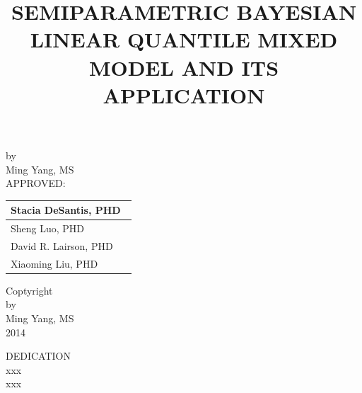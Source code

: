 \documentclass[12pt]{article}
\begin{document}
%
\begin{titlepage}
\title{\normalsize SEMIPARAMETRIC BAYESIAN LINEAR QUANTILE MIXED MODEL AND ITS APPLICATION}
\date{}
\maketitle

{\normalsize
\begin{center}
by\\[5mm]
Ming Yang, MS\\[10mm]
APPROVED:\\[10mm]
\end{center}}

\begin{table}[h]
\begin{flushright}
\begin{tabular}{ p{8cm}}

\hline
Stacia DeSantis, PHD\ \\[0.8cm]
\hline
Sheng Luo, PHD\\[0.8cm]
\hline
David R. Lairson, PHD\\[0.8cm]
\hline
Xiaoming Liu, PHD\\[0.8cm]


\end{tabular}
\end{flushright}
\label{default}
\end{table}

\thispagestyle{empty}
\pagestyle{empty}
\end{titlepage}

\newpage
\thispagestyle{empty}
\begin{center}
Coptyright\\
by\\
Ming Yang, MS\\
2014
\end{center}


\newpage
\thispagestyle{empty}
\doublespacing
\begin{center}
DEDICATION\\
xxx\\
xxx
\end{center}
\end{document}
